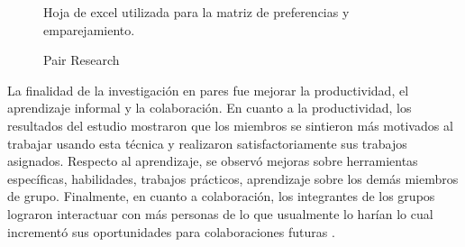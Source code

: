 \begin{figure}[h]
  \centering

  \caption{Pair Research}{Hoja de excel utilizada para la matriz de preferencias y emparejamiento.}
    \\
  \label{fig:pair_research}
\end{figure}


La finalidad de la investigación en pares fue mejorar la productividad, el aprendizaje informal y la colaboración. En cuanto a la productividad, los resultados del estudio mostraron que los miembros se sintieron más motivados al trabajar usando esta técnica y realizaron satisfactoriamente sus trabajos asignados. Respecto al aprendizaje, se observó mejoras sobre herramientas específicas, habilidades, trabajos prácticos, aprendizaje sobre los demás miembros de grupo. Finalmente, en cuanto a colaboración, los integrantes de los grupos lograron interactuar con más personas de lo que usualmente lo harían lo cual incrementó sus oportunidades para colaboraciones futuras \cite{miller_pair_2014}.\\

